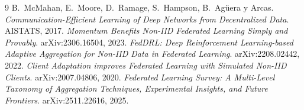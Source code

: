 \documentclass[11pt]{article}
\begin{document}
\begin{thebibliography}{9}
 B.~McMahan, E.~Moore, D.~Ramage, S.~Hampson, B.~Agüera y Arcas.
  \emph{Communication-Efficient Learning of Deep Networks from Decentralized Data}.
  AISTATS, 2017.
 \emph{Momentum Benefits Non-IID Federated Learning Simply and
  Provably}. arXiv:2306.16504, 2023.
 \emph{FedDRL: Deep Reinforcement Learning-based Adaptive
  Aggregation for Non-IID Data in Federated Learning}. arXiv:2208.02442, 2022.
 \emph{Client Adaptation improves Federated Learning with
  Simulated Non-IID Clients}. arXiv:2007.04806, 2020.
 \emph{Federated Learning Survey: A Multi-Level Taxonomy of
  Aggregation Techniques, Experimental Insights, and Future Frontiers}.
  arXiv:2511.22616, 2025.
\end{thebibliography}
\end{document}
